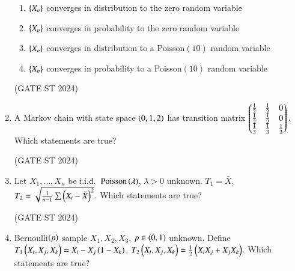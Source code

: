 \documentclass[journal,12pt,onecolumn]{IEEEtran}
\theoremstyle{remark}
\begin{document}
\begin{enumerate}
\begin{enumerate}
\item $\left\{X_n\right\}$ converges in distribution to the zero random variable
\item $\left\{X_n\right\}$ converges in probability to the zero random variable
\item $\left\{X_n\right\}$ converges in distribution to a Poisson$(10)$ random variable
\item $\left\{X_n\right\}$ converges in probability to a Poisson$(10)$ random variable
\end{enumerate}
\hfill (GATE ST 2024)
\item
A Markov chain with state space $\left(0,1,2\right)$ has transition matrix
$
\begin{pmatrix}
\frac12 & \frac12 & 0 \\
\frac12 & \frac12 & 0 \\
\frac13 & \frac13 & \frac13
\end{pmatrix}.
$
Which statements are true?

\begin{enumerate}
\end{enumerate}
\hfill (GATE ST 2024)
\item
Let $X_1,\dots,X_n$ be i.i.d.\ $\mathrm{Poisson}\left(\lambda\right)$, $\lambda>0$ unknown.  
$T_1=\bar{X}$, $T_2 = \sqrt{\frac{1}{n-1} \sum \left(X_i - \bar{X}\right)^2}$.
Which statements are true?

\begin{enumerate}
\end{enumerate}
\hfill (GATE ST 2024)
\item
Bernoulli$\left(p\right)$ sample $X_1,X_2,X_3$, $p\in\left(0,1\right)$ unknown.
Define $T_1\left(X_i,X_j,X_k\right) = X_i - X_j\left(1 - X_k\right)$,  
$T_2\left(X_i,X_j,X_k\right) = \frac12\left(X_iX_j + X_jX_k\right)$.
Which statements are true?


\end{enumerate}
\end{document}
